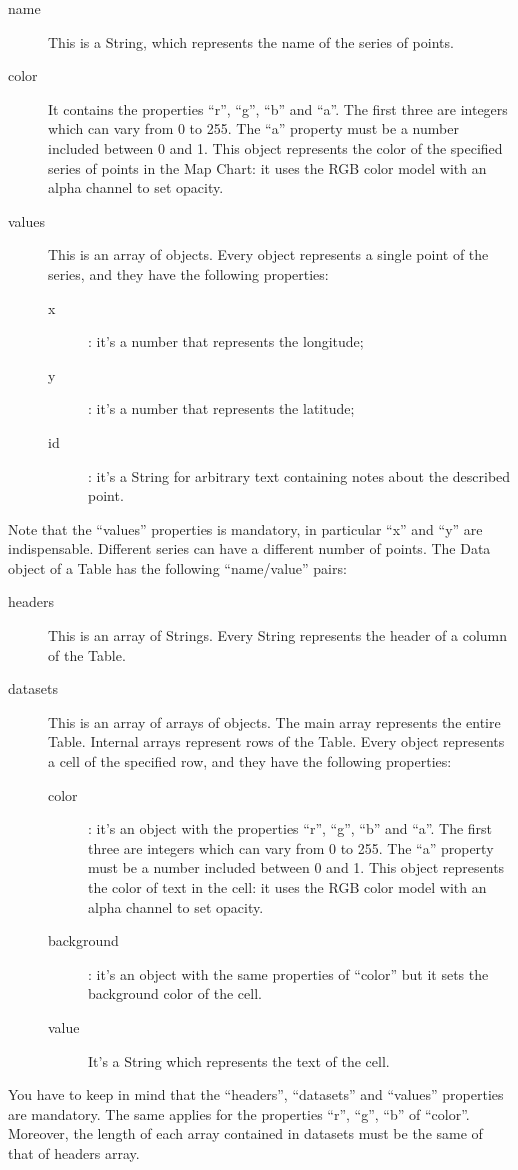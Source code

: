 				\begin{description}
					\item[name] This is a String, which represents the name of the series of points.
					\item[color] It contains the properties “r”, “g”, “b” and “a”. The first three are integers which can vary from 0 to 255. The “a” property must be a number included between 0 and 1. This object represents the color of the specified series of points in the Map Chart: it uses the RGB color model with an alpha channel to set opacity.
					\item[values] This is an array of objects. Every object represents a single point of the series, and they have the following properties:
						\begin{description}
							\item[x]: it's a number that represents the longitude;
							\item[y]: it's a number that represents the latitude;
							\item[id]: it's a String for arbitrary text containing notes about the described point.
						\end{description}
				\end{description}
				Note that the “values” properties is mandatory, in particular “x” and “y” are indispensable. Different series can have a different number of points.
				The Data object of a Table has the following “name/value” pairs:
				\begin{description}
					\item[headers] This is an array of Strings. Every String represents the header of a column of the Table.
					\item[datasets] This is an array of arrays of objects. The main array represents the entire Table. Internal arrays represent rows of the Table. Every object represents a cell of the specified row, and they have the following properties:
					\begin{description}
						\item[color]: it's an object with the properties “r”, “g”, “b” and “a”. The first three are integers which can vary from 0 to 255. The “a” property must be a number included between 0 and 1.
						This object represents the color of text in the cell: it uses the RGB color model with an alpha channel to set opacity.
						\item[background]: it's an object with the same properties of “color” but it sets the background color of the cell.
						\item[value] It's a String which represents the text of the cell.
					\end{description}
				\end{description}
				You have to keep in mind that the “headers”, “datasets” and “values” properties are mandatory. The same applies for the properties “r”, “g”, “b” of “color”. Moreover, the length of each array contained in datasets must be the same of that of headers array.

